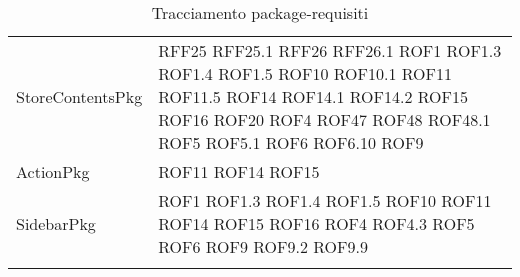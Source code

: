 \begin{longtable}{p{5cm}!{\VRule[1pt]}p{2.5cm}}
		StoreContentsPkg & RFF25 \newline RFF25.1 \newline RFF26 \newline RFF26.1 \newline ROF1 \newline ROF1.3 \newline ROF1.4 \newline ROF1.5 \newline ROF10 \newline ROF10.1 \newline ROF11 \newline ROF11.5 \newline ROF14 \newline ROF14.1 \newline ROF14.2 \newline ROF15 \newline ROF16 \newline ROF20 \newline ROF4 \newline ROF47 \newline ROF48 \newline ROF48.1 \newline ROF5 \newline ROF5.1 \newline ROF6 \newline ROF6.10 \newline ROF9\\
		ActionPkg & ROF11 \newline ROF14 \newline ROF15\\
		SidebarPkg & ROF1 \newline ROF1.3 \newline ROF1.4 \newline ROF1.5 \newline ROF10 \newline ROF11 \newline ROF14 \newline ROF15 \newline ROF16 \newline ROF4 \newline ROF4.3 \newline ROF5 \newline ROF6 \newline ROF9 \newline ROF9.2 \newline ROF9.9\\
		\caption{Tracciamento package-requisiti}
	\end{longtable}

